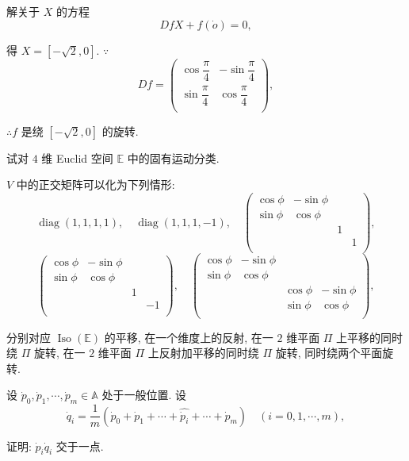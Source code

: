 \documentclass{ctexart}
\begin{document}
\begin{solution}
    解关于 $X$ 的方程
    \[DfX+f(\dot{o})=0,\]

    得 $X=[-\sqrt{2},0]$. $\because$
    \[Df=\begin{pmatrix}
        \cos\dfrac{\pi}{4} & -\sin\dfrac{\pi}{4} \\[8pt]
        \sin\dfrac{\pi}{4} & \cos\dfrac{\pi}{4} \\
    \end{pmatrix},\]

    $\therefore f$ 是绕 $[-\sqrt{2},0]$ 的旋转.
\end{solution}
\begin{exercise}[3.3]
    试对 $4$ 维 Euclid 空间 $\mathbb{E}$ 中的固有运动分类.
\end{exercise}
\begin{solution}
    $V$ 中的正交矩阵可以化为下列情形:
    \[\operatorname{diag}(1,1,1,1),\quad\operatorname{diag}(1,1,1,-1),\quad\begin{pmatrix}
        \cos\phi & -\sin\phi \\
        \sin\phi & \cos\phi \\
        && 1 \\
        &&& 1 \\
    \end{pmatrix},\]
    \[\begin{pmatrix}
        \cos\phi & -\sin\phi \\
        \sin\phi & \cos\phi \\
        && 1 \\
        &&& -1 \\
    \end{pmatrix},\quad\begin{pmatrix}
        \cos\phi & -\sin\phi \\
        \sin\phi & \cos\phi \\
        && \cos\phi & -\sin\phi \\
        && \sin\phi & \cos\phi \\
    \end{pmatrix},\]

    分别对应 $\operatorname{Iso}(\mathbb{E})$ 的平移, 在一个维度上的反射, 在一 $2$ 维平面 $\varPi$ 上平移的同时绕 $\varPi$ 旋转, 在一 $2$ 维平面 $\varPi$ 上反射加平移的同时绕 $\varPi$ 旋转, 同时绕两个平面旋转.
\end{solution}
\begin{exercise}[补充题 1]
    设 $\dot{p}_0,\dot{p}_1,\cdots,\dot{p}_m\in\mathbb{A}$ 处于一般位置. 设
    \[\dot{q}_i=\dfrac{1}{m}(\dot{p}_0+\dot{p}_1+\cdots+\widehat{\dot{p}_i}+\cdots+\dot{p}_m)\quad (i=0,1,\cdots,m),\]

    证明: $\dot{p}_i\dot{q}_i$ 交于一点.
\end{exercise}
\end{document}
